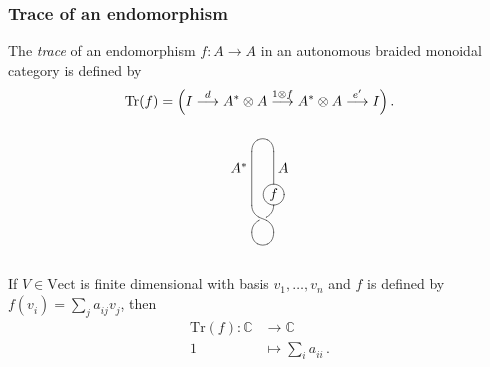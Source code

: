 \documentclass{beamer}
\newcommand{\lra}{\longrightarrow}
\begin{document}
\begin{frame}
\frametitle{Trace of an endomorphism}
The \emph{trace} of an endomorphism
$ f : A    \lra   A $
in an autonomous braided monoidal category is defined by
\[
\mathrm{Tr} (f) = \Bigl(I \stackrel{d}{\lra} A^\ast \otimes A \stackrel{1 \otimes f}{\lra}   
  A^\ast \otimes A \stackrel{e'}{\lra}  I\Bigr)\,.
\]
\[
\xygraph{
!{/r1.3pc/: /u1.6pc/::}
!{\vcap} ( [r] - [dd] ^(.3)*{A}|(.8)*+[Fo]{f}
, ? - [dd] _(.3)*{A^*}
!{\vtwistneg}
!{\vcap[-]}
)}
\]
\end{frame}
\begin{frame}
\begin{example} 
If $V \in \mathrm{Vect} $ is finite dimensional with basis $v^{}_1,\ldots,v^{}_n$ and
$f$ is defined by $f(v^{}_i) = \sum_j a^{}_{ij} v^{}_j$, then
\begin{align*}
\mathrm{Tr}(f) :  \mathbb{C}  &\lra \mathbb{C} \\
                  1 &\longmapsto \displaystyle \sum_i a^{}_{ii}\,.
\end{align*}
\end{example}

\end{frame}
\end{document}
